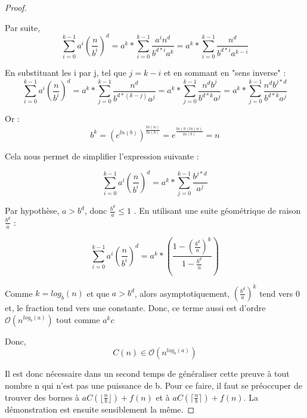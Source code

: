 \documentclass[a4paper,10pt]{article}
\begin{document}
\begin{proof}
\begin{itemize}
Par suite, 
\begin{equation}
	\sum_{i=0}^{k-1}a^i(\frac{n}{b^i})^d = a^k*\sum_{i=0}^{k-1}\frac{a^in^d}{b^{d*i}a^k} = a^k*\sum_{i=0}^{k-1}\frac{n^d}{b^{d*i}a^{k-i}}
\end{equation}

En substituant les i par j, tel que $j = k-i$ et en sommant en "sens inverse" :
\begin{equation}
	\sum_{i=0}^{k-1}a^i(\frac{n}{b^i})^d = a^k*\sum_{j=0}^{k-1}\frac{n^d}{b^{d*(k-j)}a^{j}} = a^k*\sum_{j=0}^{k-1}\frac{n^db^j}{b^{d*k}a^{j}} = a^k*\sum_{j=0}^{k-1}\frac{n^db^{j*d}}{b^{d*k}a^{j}}
\end{equation}

  Or :
  $$ b^k=(e^{ln(b)})^{\frac{ln(n)}{ln(b)}}=e^{\frac{ln(b)ln(n)}{ln(b)}}=n$$

Cela nous permet de simplifier l'expression suivante :

\begin{equation}
	\sum_{i=0}^{k-1}a^i(\frac{n}{b^i})^d = a^k*\sum_{j=0}^{k-1}\frac{b^{j*d}}{a^j}
\end{equation}

Par hypothèse,  $a>b^d$, donc $ \frac{b^d}{a} \leq 1$ . En utilisant une suite géométrique de raison  $ \frac{b^d}{a}$ : 

\begin{equation}
	\sum_{i=0}^{k-1}a^i(\frac{n}{b^i})^d = a^k*(\frac{1-(\frac{b^d}{a})^k}{1-\frac{b^d}{a}})
\end{equation}

Comme $k = log_{b}(n)$ et que $a>b^d$, alors asymptotiquement, $(\frac{b^d}{a})^k$ tend vers 0 et, le fraction tend vers une constante. 
Donc, ce terme aussi est d'ordre $\mathcal{O}(n^{log_b(a)})$ tout comme $a^kc$

Donc, $$C(n) \in \mathcal{O}(n^{log_b(a)})$$


\end{itemize}


Il est donc nécessaire dans un second temps de généraliser cette preuve à tout nombre n qui n'est pas une puissance de b. Pour ce faire, il faut se préoccuper de trouver des bornes à $aC(\lfloor \frac{n}{b} \rfloor)+f(n)$ et à $aC(\lceil \frac{n}{b} \rceil)+f(n)$. La démonstration est ensuite sensiblement la même.

\end{proof}
\end{document}
